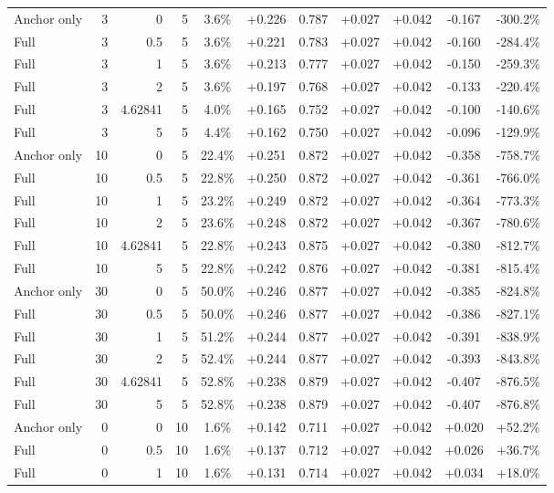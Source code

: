 \begin{table}[htbp]
\begin{tabular}{lrrrccccccc}
Anchor only & 3 & 0 & 5 & 3.6\% & +0.226 & 0.787 & +0.027 & +0.042 & -0.167 & -300.2\% \\
Full & 3 & 0.5 & 5 & 3.6\% & +0.221 & 0.783 & +0.027 & +0.042 & -0.160 & -284.4\% \\
Full & 3 & 1 & 5 & 3.6\% & +0.213 & 0.777 & +0.027 & +0.042 & -0.150 & -259.3\% \\
Full & 3 & 2 & 5 & 3.6\% & +0.197 & 0.768 & +0.027 & +0.042 & -0.133 & -220.4\% \\
Full & 3 & 4.62841 & 5 & 4.0\% & +0.165 & 0.752 & +0.027 & +0.042 & -0.100 & -140.6\% \\
Full & 3 & 5 & 5 & 4.4\% & +0.162 & 0.750 & +0.027 & +0.042 & -0.096 & -129.9\% \\
Anchor only & 10 & 0 & 5 & 22.4\% & +0.251 & 0.872 & +0.027 & +0.042 & -0.358 & -758.7\% \\
Full & 10 & 0.5 & 5 & 22.8\% & +0.250 & 0.872 & +0.027 & +0.042 & -0.361 & -766.0\% \\
Full & 10 & 1 & 5 & 23.2\% & +0.249 & 0.872 & +0.027 & +0.042 & -0.364 & -773.3\% \\
Full & 10 & 2 & 5 & 23.6\% & +0.248 & 0.872 & +0.027 & +0.042 & -0.367 & -780.6\% \\
Full & 10 & 4.62841 & 5 & 22.8\% & +0.243 & 0.875 & +0.027 & +0.042 & -0.380 & -812.7\% \\
Full & 10 & 5 & 5 & 22.8\% & +0.242 & 0.876 & +0.027 & +0.042 & -0.381 & -815.4\% \\
Anchor only & 30 & 0 & 5 & 50.0\% & +0.246 & 0.877 & +0.027 & +0.042 & -0.385 & -824.8\% \\
Full & 30 & 0.5 & 5 & 50.0\% & +0.246 & 0.877 & +0.027 & +0.042 & -0.386 & -827.1\% \\
Full & 30 & 1 & 5 & 51.2\% & +0.244 & 0.877 & +0.027 & +0.042 & -0.391 & -838.9\% \\
Full & 30 & 2 & 5 & 52.4\% & +0.244 & 0.877 & +0.027 & +0.042 & -0.393 & -843.8\% \\
Full & 30 & 4.62841 & 5 & 52.8\% & +0.238 & 0.879 & +0.027 & +0.042 & -0.407 & -876.5\% \\
Full & 30 & 5 & 5 & 52.8\% & +0.238 & 0.879 & +0.027 & +0.042 & -0.407 & -876.8\% \\
Anchor only & 0 & 0 & 10 & 1.6\% & +0.142 & 0.711 & +0.027 & +0.042 & +0.020 & +52.2\% \\
Full & 0 & 0.5 & 10 & 1.6\% & +0.137 & 0.712 & +0.027 & +0.042 & +0.026 & +36.7\% \\
Full & 0 & 1 & 10 & 1.6\% & +0.131 & 0.714 & +0.027 & +0.042 & +0.034 & +18.0\% \\

\end{tabular}
\end{table}

